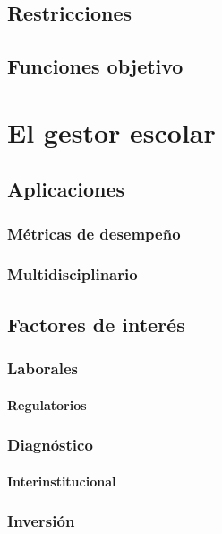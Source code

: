 \documentclass[draft,12pt,headsepline,footsepline,paper=letter]{scrreprt}
\begin{document}
\section{Restricciones}

\section{Funciones objetivo}

\chapter{El gestor escolar}

\section{Aplicaciones}

\subsection{Métricas de desempeño}

\subsection{Multidisciplinario}

\section{Factores de interés}

\subsection{Laborales}

\subsubsection{Regulatorios}

\subsection{Diagnóstico}

\subsubsection{Interinstitucional}

\subsection{Inversión}
\end{document}
